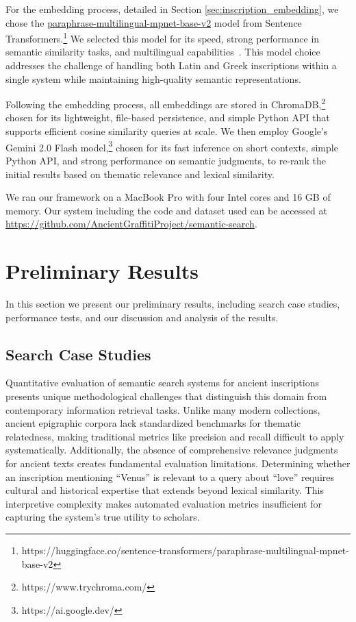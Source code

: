 \documentclass[final,greek,american]{anthology-ch}
\begin{document}
For the embedding process, detailed in Section \ref{sec:inscription_embedding}, we chose the \href{https://huggingface.co/sentence-transformers/paraphrase-multilingual-mpnet-base-v2}{paraphrase-multilingual-mpnet-base-v2} model from Sentence Transformers.\footnote{https://huggingface.co/sentence-transformers/paraphrase-multilingual-mpnet-base-v2} We selected this model for its speed, strong performance in semantic similarity tasks, and multilingual capabilities~\cite{reimers_sentence-bert_2019}.  This model choice addresses the challenge of handling both Latin and Greek inscriptions within a single system while maintaining high-quality semantic representations.

Following the embedding process, all embeddings are stored in ChromaDB,\footnote{https://www.trychroma.com/} chosen for its lightweight, file-based persistence, and simple Python API that supports efficient cosine similarity queries at scale.
We then employ Google's Gemini 2.0 Flash model,\footnote{https://ai.google.dev/} chosen for its fast inference on short contexts, simple Python API, and strong performance on semantic judgments, to re-rank the initial results based on thematic relevance and lexical similarity.

We ran our framework on a MacBook Pro with four Intel cores and 16 GB of memory. Our system including the code and dataset used can be accessed at \\ \url{https://github.com/AncientGraffitiProject/semantic-search}.
\section{Preliminary Results}
\FloatBarrier
In this section we present our preliminary results, including search case studies, performance tests, and our discussion and analysis of the results.

\subsection{Search Case Studies}

Quantitative evaluation of semantic search systems for ancient inscriptions presents unique methodological challenges that distinguish this domain from contemporary information retrieval tasks. Unlike many modern collections, ancient epigraphic corpora lack standardized benchmarks for thematic relatedness, making traditional metrics like precision and recall difficult to apply systematically. Additionally, the absence of comprehensive relevance judgments for ancient texts creates fundamental evaluation limitations. Determining whether an inscription mentioning ``Venus'' is relevant to a query about ``love'' requires cultural and historical expertise that extends beyond lexical similarity. This interpretive complexity makes automated evaluation metrics insufficient for capturing the system's true utility to scholars.
\end{document}
